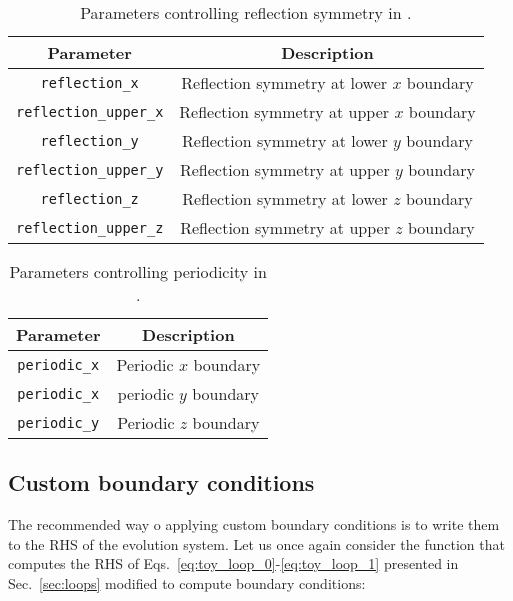 \begin{table}[ht]
  \centering
  \begin{tabular}{cc}
  Parameter                     & Description                             \\\hline\hline
  \texttt{reflection\_x}        & Reflection symmetry at lower $x$ boundary\\
  \texttt{reflection\_upper\_x} & Reflection symmetry at upper $x$ boundary\\
  \texttt{reflection\_y}        & Reflection symmetry at lower $y$ boundary\\
  \texttt{reflection\_upper\_y} & Reflection symmetry at upper $y$ boundary\\
  \texttt{reflection\_z}        & Reflection symmetry at lower $z$ boundary\\
  \texttt{reflection\_upper\_z} & Reflection symmetry at upper $z$ boundary\\\hline\hline
  \end{tabular}
  \caption{Parameters controlling reflection symmetry in \CarpetX.}
  \label{tab:reflection_params}
\end{table}

\begin{table}[ht]
  \centering
  \begin{tabular}{cc}
  Parameter            & Description          \\\hline\hline
  \texttt{periodic\_x} & Periodic $x$ boundary\\
  \texttt{periodic\_x} & periodic $y$ boundary\\
  \texttt{periodic\_y} & Periodic $z$ boundary\\\hline\hline
  \end{tabular}
  \caption{Parameters controlling periodicity in \CarpetX.}
  \label{tab:periodic_params}
\end{table}

\subsection{Custom boundary conditions}

The recommended way o applying custom boundary conditions is to write them to the RHS of the evolution system. Let us once again consider the function that computes the RHS of Eqs.~\eqref{eq:toy_loop_0}-\eqref{eq:toy_loop_1} presented in Sec.~\ref{sec:loops} modified to compute boundary conditions:

